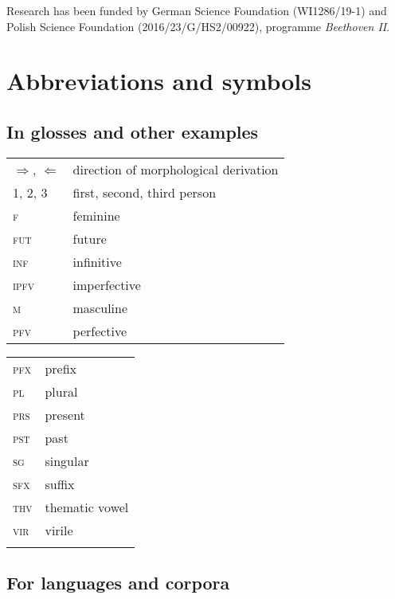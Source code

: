 \documentclass[output=paper]{langscibook}
\begin{document}
Research has been funded by German Science Foundation (WI1286/19-1) and Polish Science Foundation (2016/23/G/HS2/00922), programme \textit{Beethoven II}.

\section*{Abbreviations and symbols}

\subsection*{In glosses and other examples}

\begin{tabularx}{.5\textwidth}{@{}lQ}
${\Rightarrow}$, ${\Leftarrow}$ & direction of morphological derivation\\
\textsc{1, 2, 3} & first, second, third person\\
\textsc{f} & feminine\\
\textsc{fut} & future\\
\textsc{inf} & infinitive\\
\textsc{ipfv} & imperfective\\
\textsc{m} & masculine\\
\textsc{pfv} & perfective\\
\end{tabularx}\begin{tabularx}{.5\textwidth}{lQ@{}}
\textsc{pfx} &prefix\\
\textsc{pl} & plural\\
\textsc{prs} & present\\
\textsc{pst} & past\\
\textsc{sg} & singular\\
\textsc{sfx} & suffix\\
\textsc{thv} & thematic vowel\\
\textsc{vir} & virile\\
\\
\end{tabularx}

\subsection*{For languages and corpora}

{\sloppy\printbibliography[heading=subbibliography,notkeyword=this]}
\end{document}
